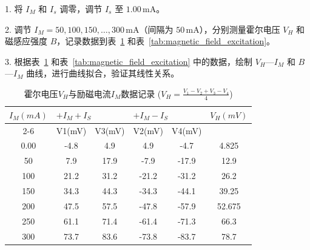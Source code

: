 \documentclass[zihao=5, UTF8]{article}
\theoremstyle{MyLineTheoremStyle} %
\theoremstyle{MyBlockTheoremStyle} %
\theoremstyle{MySubsubsectionStyle} %
\begin{document}
1. 将 $I_M$ 和 $I_s$ 调零，调节 $I_s$ 至 $1.00 \, \text{mA}$。

2. 调节 $I_M = 50, 100, 150, \dots, 300 \, \text{mA}$（间隔为 $50 \, \text{mA}$），分别测量霍尔电压 $V_H$ 和磁感应强度 $B$，记录数据到表~\ref{tab:hall_voltage_excitation} 和表~\ref{tab:magnetic_field_excitation}。

3. 根据表~\ref{tab:hall_voltage_excitation} 和表~\ref{tab:magnetic_field_excitation} 中的数据，绘制 $V_H$—$I_M$ 和 $B$—$I_M$ 曲线，进行曲线拟合，验证其线性关系。


\begin{table}[H]
\centering
\begin{tabular}{|c|c|c|c|c|c|}
\hline
\multirow{2}{*}{$I_M (mA)$} & \multicolumn{2}{l|}{$+I_M + I_S$} & \multicolumn{2}{l|}{$+I_M - I_S$} & \multicolumn{1}{l|}{$V_H (mV)$} \\ \cline{2-6} 
                             & V1(mV)       & V3(mV)       & V2(mV)       & V4(mV)       &                               \\ \hline
0.00                         & -4.8         & 4.9          & 4.9          & -4.7         & 4.825                          \\ \hline
50                           & 7.9          & 17.9         & -7.9         & -17.9        & 12.9                           \\ \hline
100                          & 21.2         & 31.2         & -21.2        & -31.2        & 26.2                           \\ \hline
150                          & 34.3         & 44.3         & -34.3        & -44.1        & 39.25                          \\ \hline
200                          & 47.5         & 57.5         & -47.8        & -57.9        & 52.675                         \\ \hline
250                          & 61.1         & 71.4         & -61.4        & -71.3        & 66.3                           \\ \hline
300                          & 73.7         & 83.6         & -73.8        & -83.7        & 78.7                           \\ \hline
\end{tabular}
\caption{霍尔电压$V_H$与励磁电流$I_M$数据记录 ($V_H = \frac{V_1 - V_2 + V_3 - V_4}{4}$)}
\label{tab:hall_voltage_excitation}
\end{table}
\end{document}
